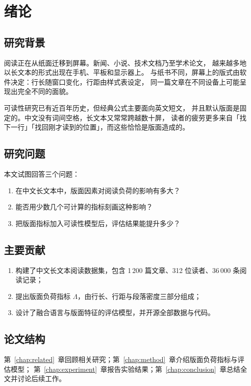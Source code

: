 \chapter{绪论}
\label{chap:intro}

\section{研究背景}

阅读正在从纸面迁移到屏幕。新闻、小说、技术文档乃至学术论文，
越来越多地以长文本的形式出现在手机、平板和显示器上。
与纸书不同，屏幕上的版式由软件决定：行长随窗口变化，行距由样式表设定，
同一篇文章在不同设备上可能呈现出完全不同的面貌。

可读性研究已有近百年历史\cite{flesch1948}，但经典公式主要面向英文短文，
并且默认版面是固定的。中文没有词间空格，长文本又常常跨越数十屏，
读者的疲劳更多来自「找下一行」「找回刚才读到的位置」，而这些恰恰是版面造成的。

\section{研究问题}

本文试图回答三个问题：
\begin{enumerate}
  \item 在中文长文本中，版面因素对阅读负荷的影响有多大？
  \item 能否用少数几个可计算的指标刻画这种影响？
  \item 把版面指标加入可读性模型后，评估结果能提升多少？
\end{enumerate}

\section{主要贡献}

\begin{enumerate}
  \item 构建了中文长文本阅读数据集，包含 1\,200 篇文章、312 位读者、36\,000 条阅读记录；
  \item 提出版面负荷指标 $\Lambda$，由行长、行距与段落密度三部分组成；
  \item 设计了融合语言与版面特征的评估模型，并开源全部数据与代码。
\end{enumerate}

\section{论文结构}

第~\ref{chap:related}~章回顾相关研究；第~\ref{chap:method}~章介绍版面负荷指标与评估模型；
第~\ref{chap:experiment}~章报告实验结果；第~\ref{chap:conclusion}~章总结全文并讨论后续工作。
